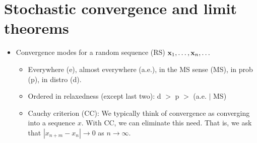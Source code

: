\documentclass[a4paper, oneside]{book}
\begin{document}
\section{Stochastic convergence and limit theorems}
\begin{itemize}
\item Convergence modes for a random sequence (RS) $\mathbf{x}_1, \hdots, \mathbf{x}_n, \hdots$
\begin{itemize}
\item Everywhere (e), almost everywhere (a.e.), in the MS sense (MS), in prob (p), in distro (d).
\item Ordered in relaxedness (except last two): d $>$ p $>$ (a.e. $|$ MS)
\item Cauchy criterion (CC): We typically think of convergence as converging into a sequence $x$. With CC, we can eliminate this need. That is, we ask that $|x_{n+m}-x_n|\to	0$ as $n\to	\infty$.
\end{itemize}
\end{itemize}
\end{document}
